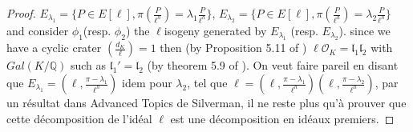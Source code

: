 \documentclass{lms}
\begin{document}
\begin{proof}
$E_{\lambda_1}=\{P \in E[\ell],  \pi(\frac{P}{\ell^h})=\lambda_1\frac{P}{\ell^h}\}$, $E_{\lambda_2}=\{P \in E[\ell],  \pi(\frac{P}{\ell^h})=\lambda_2\frac{P}{\ell^h}\}$ and consider $\phi_1$(resp. $\phi_2$) the $\ell$isogeny generated by $E_{\lambda_1}$ (resp. $E_{\lambda_2}$).
since we have a cyclic crater $\left( \frac{d_K}{\ell} \right)=1$ then (by Proposition 5.11 of \cite{Cox89} )  $\ell \mathcal{O}_K=\mathfrak{l}_1\mathfrak{l}_2$ with $Gal(K/\mathbb{Q})$ such as $\mathfrak{l}_1'=\mathfrak{l}_2$ (by theorem 5.9 of \cite{Cox89}).
On veut faire pareil en disant que $E_{\lambda_1}=(\ell, \frac{\pi - \lambda_1}{\ell^h})$ idem pour $\lambda_2$, tel que $\ell=(\ell, \frac{\pi - \lambda_1}{\ell^h})(\ell, \frac{\pi - \lambda_2}{\ell^h})$, par un résultat dans Advanced Topics de Silverman, il ne reste plus qu'à prouver que cette décomposition de l'idéal $\ell$ est une décomposition en idéaux premiers. 
\end{proof}
\end{document}
